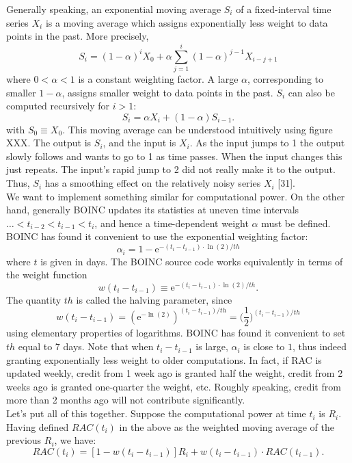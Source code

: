 Generally speaking, an exponential moving average $S_i$ of a fixed-interval time series $X_i$ is a moving average which assigns exponentially less weight to data points in the past. More precisely,
\begin{equation}
S_i = (1-\alpha)^i X_0 + \alpha \sum_{j = 1}^i (1-\alpha)^{j-1} X_{i-j+1}
\end{equation} 
where $0 < \alpha < 1$ is a constant weighting factor. A large $\alpha$, corresponding to smaller $1-\alpha$, assigns smaller weight to data points in the past. $S_i$ can also be computed recursively for $i > 1$:
\begin{equation}
S_i = \alpha X_i + (1-\alpha) S_{i-1}.
\end{equation}
with $S_0 \equiv X_0$. This moving average can be understood intuitively using figure XXX. The output is $S_i$, and the input is $X_i$. As the input jumps to 1 the output slowly follows and wants to go to 1 as time passes. When the input changes this just repeats. The input’s rapid jump to 2 did not really make it to the output. Thus, $S_i$ has a smoothing effect on the relatively noisy series $X_i$ [31]. \\
We want to implement something similar for computational power. On the other hand, generally BOINC updates its statistics at uneven time intervals $\ldots <  t_{i-2} < t_{i-1} < t_i$, and hence a time-dependent weight $\alpha$ must be defined. BOINC has found it convenient to use the exponential weighting factor:
\begin{equation}
\alpha_i = 1 - \mathrm{e}^{-(t_i-t_{i-1}) \cdot  \ln(2) / th}  
\end{equation}
where $t$ is given in days. The BOINC source code works equivalently in terms of the weight function 
\begin{equation}
w(t_i - t_{i-1}) \equiv \mathrm{e}^{-(t_i-t_{i-1}) \cdot  \ln(2) / th}.
\end{equation}
 The quantity $th$ is called the halving parameter, since
\begin{equation}
w(t_i - t_{i-1})  =  \left( \mathrm{e}^{-\ln(2)} \right)^{(t_i-t_{i-1})/th} = \bigg(\frac{1}{2}\bigg)^{(t_i-t_{i-1})/th}
\end{equation}
using elementary properties of logarithms. BOINC has found it convenient to set $th$ equal to 7 days. Note that when $t_i - t_{i-1}$ is large, $\alpha_i$ is close to $1$, thus indeed granting exponentially less weight to older computations. In fact, if RAC is updated weekly, credit from 1 week ago is granted half the weight, credit from 2 weeks ago is granted one-quarter the weight, etc. Roughly speaking, credit from more than 2 months ago will not contribute significantly. \\
Let's put all of this together. Suppose the computational power at time $t_i$ is $R_i$. Having defined $RAC(t_i)$ in the above as the weighted moving average of the previous $R_i$, we have:
\begin{equation}
RAC(t_i) = \left[1 - w(t_i - t_{i-1})\right] R_i + w(t_i - t_{i-1}) \cdot RAC(t_{i-1}).
\end{equation}

